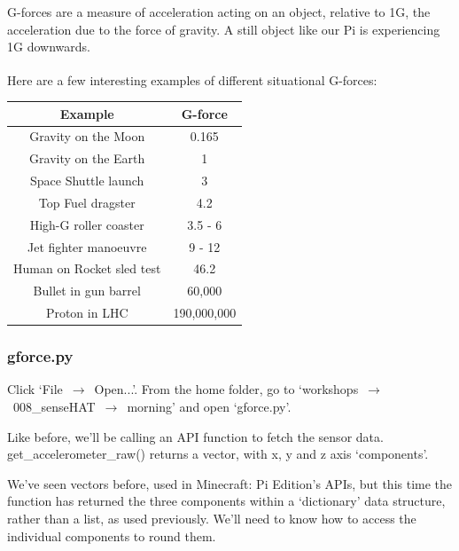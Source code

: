 	\ifprint\else
	\begin{aside}[G-forces]
		G-forces are a measure of acceleration acting on an object, relative to 1G, the acceleration due to the force of gravity. A still object like our Pi is experiencing 1G downwards.
		
		Here are a few interesting examples of different situational G-forces:\textsuperscript{\cite{gforce}}
		\color{Black}
		\begin{tabular}{|c|c|}
			\hline \textbf{Example} & \textbf{G-force} \\ 
			\hline Gravity on the Moon & 0.165 \\ 
			\hline Gravity on the Earth & 1 \\ 
			\hline Space Shuttle launch & 3 \\ 
			\hline Top Fuel dragster & 4.2 \\ 
			\hline High-G roller coaster & 3.5 - 6 \\ 
			\hline Jet fighter manoeuvre & 9 - 12 \\ 
			\hline Human on Rocket sled test & 46.2 \\ 
			\hline Bullet in gun barrel & 60,000 \\ 
			\hline Proton in LHC & 190,000,000 \\ 
			\hline 
		\end{tabular}
	\end{aside}
	\fi
	
	\subsubsection*{gforce.py}
	
	Click \mbox{`File $\rightarrow$ Open...'}.
	From the home folder, go to \mbox{`workshops $\rightarrow$ 008\_senseHAT $\rightarrow$ morning'} and open `gforce.py'.
	
	Like before, we'll be calling an API function to fetch the sensor data. get\_accelerometer\_raw() returns a vector, with x, y and z axis `components'.
	
	
	
	We've seen vectors before, used in Minecraft: Pi Edition's APIs, but this time the function has returned the three components within a `dictionary' data structure, rather than a list, as used previously. We'll need to know how to access the individual components to round them.
	
